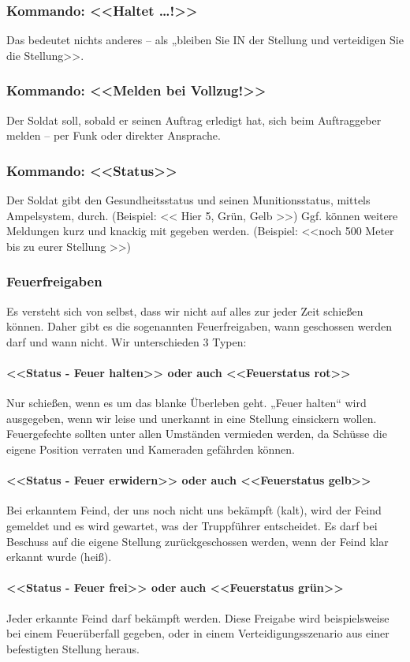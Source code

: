 \subsubsection{Kommando: <<Haltet …!>>}
Das bedeutet nichts anderes – als „bleiben Sie IN der Stellung und verteidigen Sie die Stellung>>. \\
\subsubsection{Kommando: <<Melden bei Vollzug!>>}
Der Soldat soll, sobald er seinen Auftrag erledigt hat, sich beim Auftraggeber melden – per Funk oder direkter Ansprache. \\
\subsubsection{Kommando: <<Status>>}
Der Soldat gibt den Gesundheitsstatus und seinen Munitionsstatus, mittels Ampelsystem, durch. (Beispiel: << Hier 5, Grün, Gelb >>) Ggf. können weitere Meldungen kurz und knackig mit gegeben werden. (Beispiel: <<noch 500 Meter bis zu eurer Stellung >>) \\

\subsubsection{Feuerfreigaben}
Es versteht sich von selbst, dass wir nicht auf alles zur jeder Zeit schießen können. Daher gibt es die sogenannten Feuerfreigaben, wann geschossen werden darf und wann nicht. Wir unterschieden 3 Typen: \\
\paragraph{<<Status - Feuer halten>>  oder auch <<Feuerstatus rot>> }
Nur schießen, wenn es um das blanke Überleben geht. „Feuer halten“ wird ausgegeben, wenn wir leise und unerkannt in eine Stellung einsickern wollen. Feuergefechte sollten unter allen Umständen vermieden werden, da Schüsse die eigene Position verraten und Kameraden gefährden können. \\
\paragraph{<<Status - Feuer erwidern>>  oder auch <<Feuerstatus gelb>> }
Bei erkanntem Feind, der uns noch nicht uns bekämpft (kalt), wird der Feind gemeldet und es wird gewartet, was der Truppführer entscheidet. Es darf bei Beschuss auf die eigene Stellung zurückgeschossen werden, wenn der Feind klar erkannt wurde (heiß). \\
\paragraph{<<Status - Feuer frei>> oder auch <<Feuerstatus grün>> }
Jeder erkannte Feind darf bekämpft werden. Diese Freigabe wird beispielsweise bei einem Feuerüberfall gegeben, oder in einem Verteidigungsszenario aus einer befestigten Stellung heraus. \\

